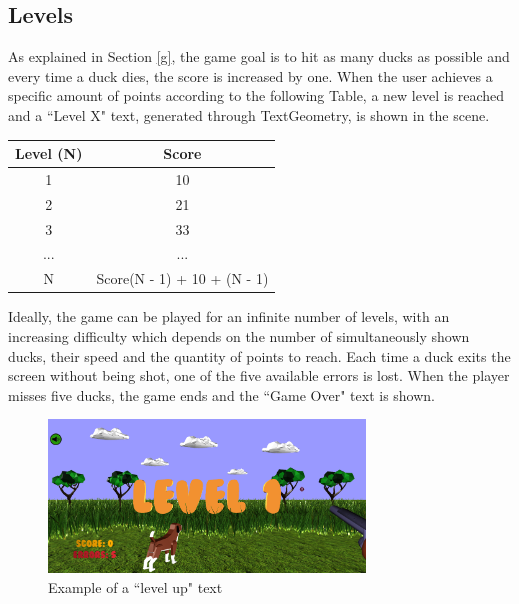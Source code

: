 \documentclass[12pt,a4paper]{article}
\begin{document}
	\subsection{Levels}
	As explained in Section \ref{g}, the game goal is to hit as many ducks 
	as possible and every time a duck dies, the score is increased by one. 
	When the user achieves a specific amount of points according to the 
	following Table, a new level is reached and a ``Level X" text, 
	generated through TextGeometry, is shown in the scene.
	\begin{center}
		\begin{tabular}{ ||c|c|| } 
		 \hline
		 \textbf{Level (N)} & \textbf{Score} \\ 
		 \hline
		 1 & 10 \\
		 2 & 21 \\ 
		 3 & 33 \\
		 ... & ... \\
		 N & Score(N - 1) + 10 + (N - 1) \\
		 \hline
		\end{tabular}
		\label{points}
	\end{center}
	Ideally, the game can be played for an infinite number of levels, 
	with an increasing difficulty which depends on the number of 
	simultaneously shown ducks, their speed and the quantity of points 
	to reach.
	Each time a duck exits the screen without being shot, one of the 
	five available errors is lost. When the player misses five ducks, 
	the game ends and the ``Game Over" text is shown.
	\begin{figure}[hbt!]
		\centering
		\includegraphics[width=0.75\textwidth]{levels}
		\caption{Example of a ``level up" text}
		\label{fig4}
	\end{figure}
	
\end{document}
